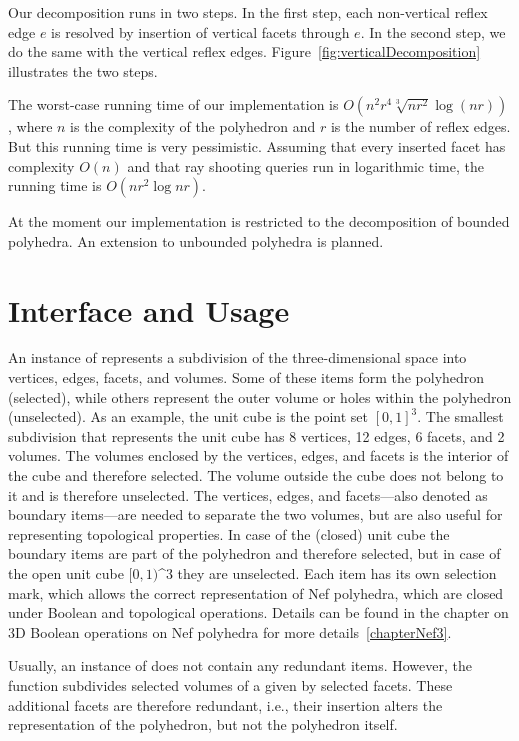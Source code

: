 Our decomposition runs in two steps. In the first step, each
non-vertical reflex edge $e$ is resolved by insertion of vertical
facets through $e$. In the second step, we do the same with the
vertical reflex edges. Figure~\ref{fig:verticalDecomposition}
illustrates the two steps.

The worst-case running time of our implementation is
$O(n^2r^4\sqrt[3]{nr^2}\log{(nr)})$, where $n$ is the complexity of the
polyhedron and $r$ is the number of reflex edges. But this running
time is very pessimistic. Assuming that every inserted facet has
complexity $O(n)$ and that ray shooting queries run in logarithmic
time, the running time is $O(nr^2\log{nr})$.

At the moment our implementation is restricted to the decomposition of
bounded polyhedra. An extension to unbounded polyhedra is planned.

\section{Interface and Usage}

An instance of  represents a subdivision of the
three-dimensional space into vertices, edges, facets, and
volumes. Some of these items form the polyhedron (selected), while
others represent the outer volume or holes within the polyhedron
(unselected). As an example, the unit cube is the point set
$[0,1]^3$. The smallest subdivision that represents the unit cube has
8 vertices, 12 edges, 6 facets, and 2 volumes. The volumes enclosed by
the vertices, edges, and facets is the interior of the cube and
therefore selected. The volume outside the cube does not belong to it
and is therefore unselected. The vertices, edges, and facets---also
denoted as boundary items---are needed to separate the two volumes,
but are also useful for representing topological properties. In case
of the (closed) unit cube the boundary items are part of the
polyhedron and therefore selected, but in case of the open unit cube
$[0,1)$^3 they are unselected. Each item has its own selection mark,
which allows the correct representation of Nef polyhedra, which are
closed under Boolean and topological operations. Details can be found
in the chapter on 3D Boolean operations on Nef polyhedra for more
details~\ref{chapterNef3}.

Usually, an instance of  does not contain any
redundant items. However, the function 
subdivides selected volumes of a given  by
selected facets. These additional facets are therefore redundant,
i.e., their insertion alters the representation of the polyhedron, but
not the polyhedron itself. 

